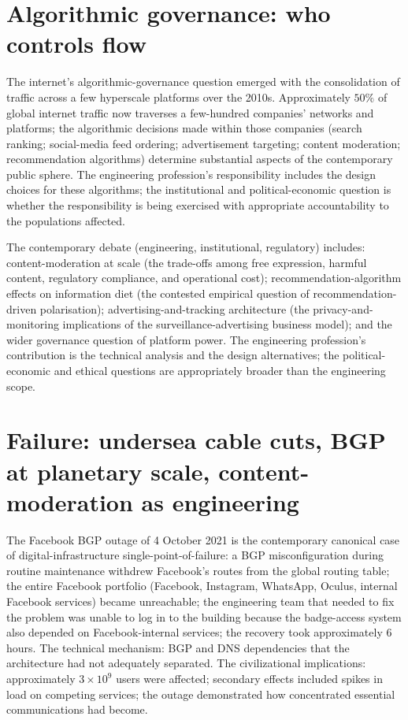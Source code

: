 \section{Algorithmic governance: who controls flow}

The internet's algorithmic-governance question emerged with the consolidation of traffic across a few hyperscale platforms over the 2010s. Approximately $50\%$ of global internet traffic now traverses a few-hundred companies' networks and platforms; the algorithmic decisions made within those companies (search ranking; social-media feed ordering; advertisement targeting; content moderation; recommendation algorithms) determine substantial aspects of the contemporary public sphere. The engineering profession's responsibility includes the design choices for these algorithms; the institutional and political-economic question is whether the responsibility is being exercised with appropriate accountability to the populations affected.

The contemporary debate (engineering, institutional, regulatory) includes: content-moderation at scale (the trade-offs among free expression, harmful content, regulatory compliance, and operational cost); recommendation-algorithm effects on information diet (the contested empirical question of recommendation-driven polarisation); advertising-and-tracking architecture (the privacy-and-monitoring implications of the surveillance-advertising business model); and the wider governance question of platform power. The engineering profession's contribution is the technical analysis and the design alternatives; the political-economic and ethical questions are appropriately broader than the engineering scope.

\section{Failure: undersea cable cuts, BGP at planetary scale, content-moderation as engineering}

The Facebook BGP outage of 4 October 2021 \cite{paper:janardhan-facebook-outage-2021} is the contemporary canonical case of digital-infrastructure single-point-of-failure: a BGP misconfiguration during routine maintenance withdrew Facebook's routes from the global routing table; the entire Facebook portfolio (Facebook, Instagram, WhatsApp, Oculus, internal Facebook services) became unreachable; the engineering team that needed to fix the problem was unable to log in to the building because the badge-access system also depended on Facebook-internal services; the recovery took approximately $6$ hours. The technical mechanism: BGP and DNS dependencies that the architecture had not adequately separated. The civilizational implications: approximately $3 \times 10^9$ users were affected; secondary effects included spikes in load on competing services; the outage demonstrated how concentrated essential communications had become.

